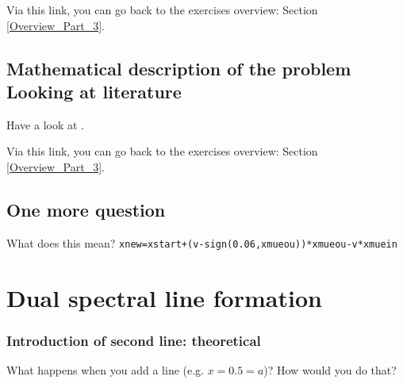 \documentclass[../main/main.tex]{subfiles}
\begin{document}
\vspace{0.7cm}
Via this link, you can go back to the exercises overview: Section \underline{\ref{Overview_Part_3}}.

\newpage
\subsection{Mathematical description of the problem \\
Looking at literature}
Have a look at \cite{NoebauerUlrichM_2019MCRT}.

\vspace{0.4cm}
Via this link, you can go back to the exercises overview: Section \underline{\ref{Overview_Part_3}}.


\subsection{One more question}
What does this mean? \texttt{xnew=xstart+(v-sign(0.06,xmueou))*xmueou-v*xmuein}

\newpage
\section{Dual spectral line formation}
\label{two_resonance_lines}

\subsubsection{Introduction of second line: theoretical}
\label{second_line}
What happens when you add a line (e.g. \@ $x=0.5=a$)? How would you do that?
\end{document}
